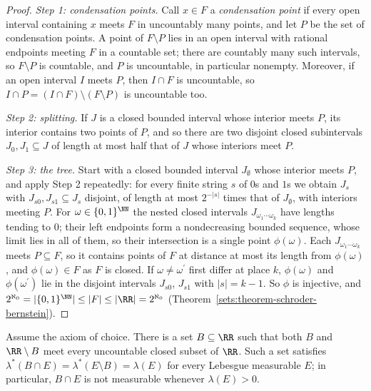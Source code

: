 \begin{proof}
\emph{Step 1: condensation points.} Call $x \in F$ a \emph{condensation point} if every open interval containing $x$ meets $F$ in uncountably many points, and let $P$ be the set of condensation points.
A point of $F \setminus P$ lies in an open interval with rational endpoints meeting $F$ in a countable set; there are countably many such intervals, so $F \setminus P$ is countable, and $P$ is
uncountable, in particular nonempty. Moreover, if an open interval $I$ meets $P$, then $I \cap F$ is uncountable, so $I \cap P = (I \cap F) \setminus (F \setminus P)$ is uncountable too.

\emph{Step 2: splitting.} If $J$ is a closed bounded interval whose interior meets $P$, its interior contains two points of $P$, and so there are two disjoint closed subintervals $J_0, J_1 \subseteq J$
of length at most half that of $J$ whose interiors meet $P$.

\emph{Step 3: the tree.} Start with a closed bounded interval $J_\emptyset$ whose interior meets $P$, and apply Step 2 repeatedly: for every finite string $s$ of $0$s and $1$s we obtain $J_s$ with
$J_{s0}, J_{s1} \subseteq J_s$ disjoint, of length at most $2^{-|s|}$ times that of $J_\emptyset$, with interiors meeting $P$. For $\omega \in \{0, 1\}^\NN$ the nested closed intervals
$J_{\omega_1 \cdots \omega_k}$ have lengths tending to $0$; their left endpoints form a nondecreasing bounded sequence, whose limit lies in all of them, so their intersection is a single point $\phi(\omega)$. Each $J_{\omega_1 \cdots \omega_k}$
meets $P \subseteq F$, so it contains points of $F$ at distance at most its length from $\phi(\omega)$, and $\phi(\omega) \in F$ as $F$ is closed. If $\omega \neq \omega^{\prime}$ first differ at place
$k$, $\phi(\omega)$ and $\phi(\omega^{\prime})$ lie in the disjoint intervals $J_{s0}$, $J_{s1}$ with $|s| = k - 1$. So $\phi$ is injective, and
$2^{\aleph_0} = |\{0, 1\}^\NN| \leq |F| \leq |\RR| = 2^{\aleph_0}$ (Theorem~\ref{sets:theorem-schroder-bernstein}).
\end{proof}

\begin{theorem}\label{measure-theory:theorem-bernstein}
Assume the axiom of choice. There is a set $B \subseteq \RR$ such that both $B$ and $\RR \setminus B$ meet every uncountable closed subset of $\RR$. Such a set satisfies
$\lambda^*(B \cap E) = \lambda^*(E \setminus B) = \lambda(E)$ for every Lebesgue measurable $E$; in particular, $B \cap E$ is not measurable whenever $\lambda(E) > 0$.
\end{theorem}

